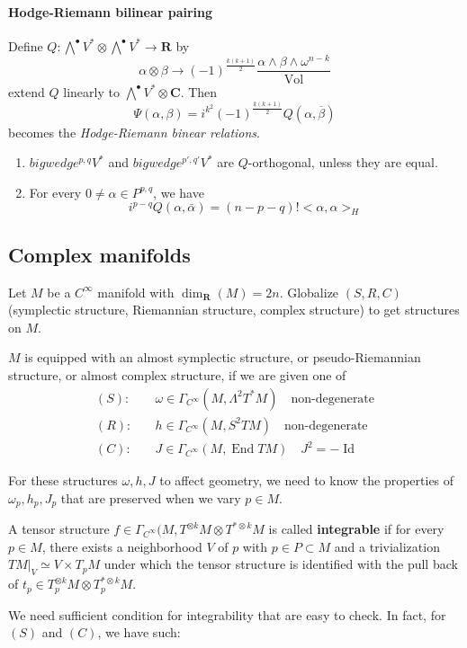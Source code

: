 \documentclass[
11pt, %
letterpaper， %
oneside, %
headinclude,footinclude, %
BCOR5mm, %
]{scrartcl}
\newcommand{\R}{{\mathbf{R}}}
\newcommand{\C}{{\mathbf{C}}}
\newcommand{\End}{\operatorname{End}}
\newcommand{\id}{\operatorname{Id}}
\newcommand{\vol}{\operatorname{Vol}}
\newcommand{\bfs}{\textbf}
\newcommand{\its}{\textit}
\begin{document}
\paragraph{Hodge-Riemann bilinear pairing}
Define $Q:\bigwedge^{\bullet}V^*\otimes \bigwedge^{\bullet}V^*\to \R$ by
\begin{equation*}
\alpha \otimes \beta \longrightarrow (-1)^{ \frac{k(k+1)}{2}}\frac{\alpha\wedge\beta\wedge \omega^{n-k}}{\vol}
\end{equation*}
extend $Q$ linearly to $\bigwedge^{\bullet}V^*\otimes \C$. Then
\begin{equation*}
	\Psi(\alpha,\beta)=i^{k^2}(-1)^{ \frac{k(k+1)}{2}} Q(\alpha,\overline{\beta})
\end{equation*}
becomes the \its{Hodge-Riemann binear relations}.
\begin{enumerate}
	\item $bigwedge^{p,q}V^*$ and $bigwedge^{p',q'}V^*$ are $Q$-orthogonal, unless they are equal.
	\item  For every $0\not=\alpha \in P^{p,q}$, we have 
	\begin{equation*}
	i^{p-q}Q(\alpha,\bar{\alpha})=(n-p-q)!<\alpha,\alpha>_H
	\end{equation*}
\end{enumerate}
\subsection{Complex manifolds}
Let $M$ be a $C^{\infty}$ manifold with $\dim_{\R}(M)=2n$. Globalize $(S,R,C)$ (symplectic structure, Riemannian structure, complex structure) to get structures on $M$.

\begin{definition}
	$M$ is equipped with an almost symplectic structure, or pseudo-Riemannian structure, or almost complex structure, if we are given one of 
	\begin{align*}
	(S):\quad& \omega \in \Gamma_{C^{\infty}}(M, \Lambda^2 T^*M)\quad \text{non-degenerate}\\
	(R):\quad& h \in \Gamma_{C^{\infty}}(M, S^2 TM)\quad \text{non-degenerate}\\
	(C):\quad& J \in \Gamma_{C^{\infty}}(M, \End TM)\quad J^2=-\id	
	\end{align*}
\end{definition}
For these structures $\omega, h, J$ to affect geometry, we need to know the properties of $\omega_p, h_p, J_p$ that are preserved when we vary $p\in M$.
\begin{definition}
	A tensor structure $f\in \Gamma_{C^{\infty}}(M, T^{\otimes k}M\otimes T^{* \otimes k}M$ is called \bfs{integrable} if for every$p\in M$, there exists a neighborhood $V$ of $p$ with $p\in P\subset M$ and a trivialization $TM|_V\simeq V\times T_pM$ under which the tensor structure is identified with the pull back of $t_p\in T^{\otimes k}_pM\otimes T^{* \otimes k}_pM$.
\end{definition}
\begin{rem}
	We need sufficient condition for integrability that are easy to check. In fact, for $(S)$ and $(C)$, we have such:
\end{rem}
\end{document}
